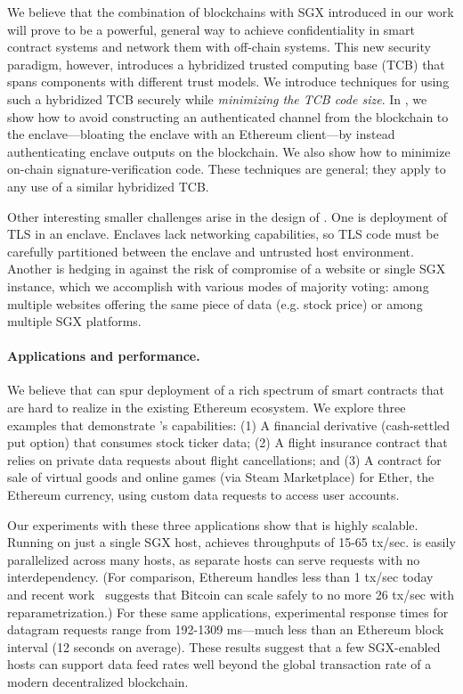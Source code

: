 
We believe that the combination of blockchains with SGX introduced in our work will prove to be a powerful, general way to achieve confidentiality in smart contract systems and network them with off-chain systems. This new security paradigm, however, introduces a hybridized trusted computing base (TCB) that spans components with different trust models. We introduce techniques for using such a hybridized TCB securely while {\em minimizing the TCB code size}. In \tc, we show how to avoid constructing an authenticated channel from the blockchain to the enclave---bloating the enclave with an Ethereum client---by instead authenticating enclave outputs on the blockchain. We also show how to minimize on-chain signature-verification code. These techniques are general; they apply to any use of a similar hybridized TCB.

Other interesting smaller challenges arise in the design of \tc. One is deployment of TLS in an enclave. Enclaves lack networking capabilities, so TLS code must be carefully partitioned between the enclave and untrusted host environment. Another is hedging in \tc against the risk of compromise of a website or single SGX instance, which we accomplish with various modes of majority voting: among multiple websites offering the same piece of data (e.g. stock price) or among multiple SGX platforms.

\paragraph{Applications and performance.} 
We believe that \tc can spur deployment of a rich spectrum of smart contracts that are hard to realize in the existing Ethereum ecosystem. We explore three examples that demonstrate \tc's capabilities: (1) A financial derivative (cash-settled put option) that consumes stock ticker data; (2) A flight insurance contract that relies on private data requests about flight cancellations; and (3) A contract for sale of virtual goods and online games (via Steam Marketplace) for Ether, the Ethereum currency, using custom data requests to access user accounts. 

Our experiments with these three applications show that \tc is highly scalable. Running on just a single SGX host, \tc achieves throughputs of 15-65 tx/sec. \tc is easily parallelized across many hosts, as separate \tc hosts can serve requests with no interdependency. (For comparison, Ethereum handles less than 1 tx/sec today and recent work~\cite{blockchainscaling} suggests that Bitcoin can scale safely to no more 26 tx/sec with reparametrization.) For these same applications, experimental response times for datagram requests range from 192-1309 ms---much less than an Ethereum block interval (12 seconds on average). These results suggest that a few SGX-enabled hosts can support \tc data feed rates well beyond the global transaction rate of a modern decentralized blockchain.

